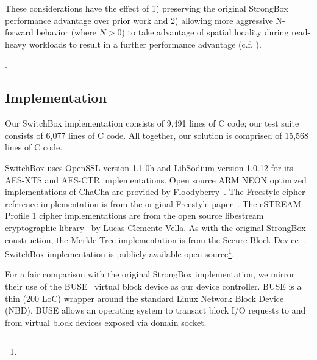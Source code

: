 These considerations have the effect of 1) preserving the original StrongBox
performance advantage over prior work and 2) allowing more aggressive N-forward
behavior (where $N > 0$) to take advantage of spatial locality during read-heavy
workloads to result in a further performance advantage (c.f.
).

.

\subsection{Implementation}

Our SwitchBox implementation consists of 9,491 lines of C code; our test suite
consists of 6,077 lines of C code. All together, our solution is comprised of
15,568 lines of C code.

SwitchBox uses OpenSSL version 1.1.0h and LibSodium version 1.0.12 for its
AES-XTS and AES-CTR implementations. Open source ARM NEON optimized
implementations of ChaCha are provided by Floodyberry~\cite{Floodyberry}. The
Freestyle cipher reference implementation is from the original Freestyle
paper~\cite{Freestyle}. The eSTREAM Profile 1 cipher implementations are from
the open source libestream cryptographic library~\cite{libestream} by Lucas
Clemente Vella. As with the original StrongBox construction, the Merkle Tree
implementation is from the Secure Block Device~\cite{SBD}. SwitchBox
implementation is publicly available open-source\footnote{\SystemURI}.

For a fair comparison with the original StrongBox implementation, we mirror
their use of the BUSE~\cite{BUSE} virtual block device as our device controller.
BUSE is a thin (200 LoC) wrapper around the standard Linux Network Block Device
(NBD). BUSE allows an operating system to transact block I/O requests to and
from virtual block devices exposed via domain socket.

